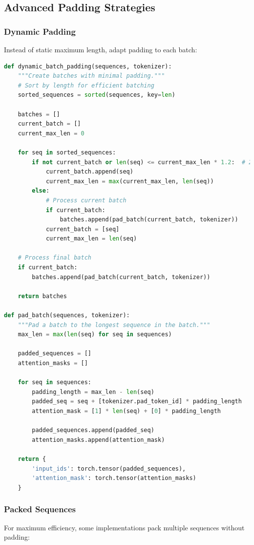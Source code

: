 \subsection{Advanced Padding Strategies}

\subsubsection{Dynamic Padding}
Instead of static maximum length, adapt padding to each batch:

\begin{lstlisting}[language=Python]
def dynamic_batch_padding(sequences, tokenizer):
    """Create batches with minimal padding."""
    # Sort by length for efficient batching
    sorted_sequences = sorted(sequences, key=len)
    
    batches = []
    current_batch = []
    current_max_len = 0
    
    for seq in sorted_sequences:
        if not current_batch or len(seq) <= current_max_len * 1.2:  # 20% tolerance
            current_batch.append(seq)
            current_max_len = max(current_max_len, len(seq))
        else:
            # Process current batch
            if current_batch:
                batches.append(pad_batch(current_batch, tokenizer))
            current_batch = [seq]
            current_max_len = len(seq)
    
    # Process final batch
    if current_batch:
        batches.append(pad_batch(current_batch, tokenizer))
    
    return batches

def pad_batch(sequences, tokenizer):
    """Pad a batch to the longest sequence in the batch."""
    max_len = max(len(seq) for seq in sequences)
    
    padded_sequences = []
    attention_masks = []
    
    for seq in sequences:
        padding_length = max_len - len(seq)
        padded_seq = seq + [tokenizer.pad_token_id] * padding_length
        attention_mask = [1] * len(seq) + [0] * padding_length
        
        padded_sequences.append(padded_seq)
        attention_masks.append(attention_mask)
    
    return {
        'input_ids': torch.tensor(padded_sequences),
        'attention_mask': torch.tensor(attention_masks)
    }
\end{lstlisting}

\subsubsection{Packed Sequences}
For maximum efficiency, some implementations pack multiple sequences without padding:

